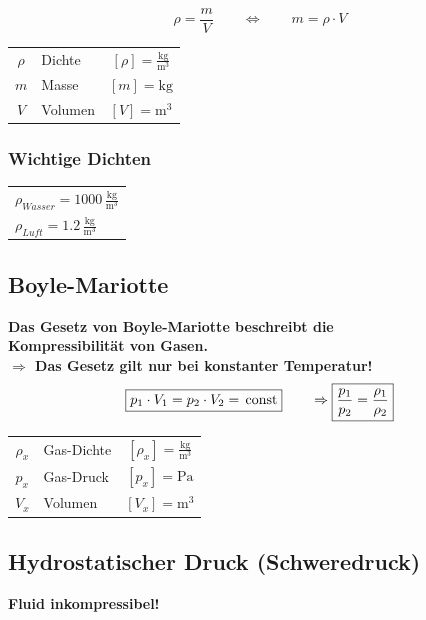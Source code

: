 $$ \boxed{ \rho = \frac{m}{V} } \qquad \Leftrightarrow \qquad \boxed{ m = \rho \cdot V }$$	 


	\begin{tabular}{c l c}
		$\rho$ & Dichte & $[\rho] = \mathrm{\frac{kg}{m^3}}$ \\
		$m$ & Masse & $[m] = \mathrm{kg} $ \\
		$V$ & Volumen & $[V] = \mathrm{m^3}$ \\
	\end{tabular}
	
	
\subsubsection{Wichtige Dichten}	
	
	\begin{tabular}{l}
		$\rho_{Wasser} = 1000 \, \mathrm{\frac{kg}{m^3}}  $ \\
		$\rho_{Luft} = 1.2 \, \mathrm{\frac{kg}{m^3}}  $ \\
	\end{tabular}
	
	
	
	
\subsection{Boyle-Mariotte}	
\textbf{Das Gesetz von Boyle-Mariotte beschreibt die \\
Kompressibilität von Gasen.} \\
\textbf{$\Rightarrow$ Das Gesetz gilt nur bei konstanter Temperatur!} \\

$$ \boxed{ p_1 \cdot V_1 = p_2 \cdot V_2 = \, \mathrm{const} } \qquad  \Rightarrow  \boxed{ \frac{p_1}{p_2} = \frac{\rho_1}{\rho_2} }$$ 


	\begin{tabular}{c l c}
		\rule{0pt}{8pt}$\rho_x$ & Gas-Dichte & $[\rho_x] = \mathrm{\frac{kg}{m^3}}$ \\
		$p_x$ & Gas-Druck & $[p_x] = \mathrm{Pa} $ \\
		$V_x$ & Volumen & $[V_x] = \mathrm{m^3}$ \\
	\end{tabular}
	
	
	
\subsection{Hydrostatischer Druck (Schweredruck)}
\textbf{Fluid inkompressibel!} 

